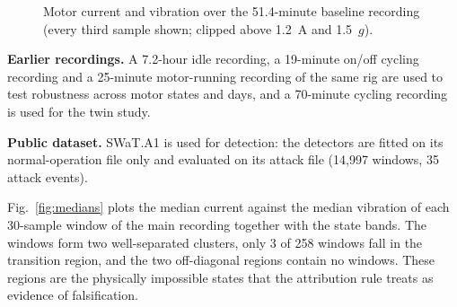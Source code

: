 \documentclass[11pt,a4paper]{article}
\begin{document}
\begin{figure}[H]
\centering
{}
\caption{Motor current and vibration over the 51.4-minute baseline recording (every third sample shown; clipped above 1.2~A and 1.5~$g$).}
\label{fig:baseline}
\end{figure}

\textbf{Earlier recordings.} A 7.2-hour idle recording, a 19-minute on/off cycling recording and a 25-minute motor-running recording of the same rig are used to test robustness across motor states and days, and a 70-minute cycling recording is used for the twin study.

\textbf{Public dataset.} SWaT.A1 \cite{goh2016swat} is used for detection: the detectors are fitted on its normal-operation file only and evaluated on its attack file (14,997 windows, 35 attack events).

Fig.~\ref{fig:medians} plots the median current against the median vibration of each 30-sample window of the main recording together with the state bands. The windows form two well-separated clusters, only 3 of 258 windows fall in the transition region, and the two off-diagonal regions contain no windows. These regions are the physically impossible states that the attribution rule treats as evidence of falsification.
\end{document}

